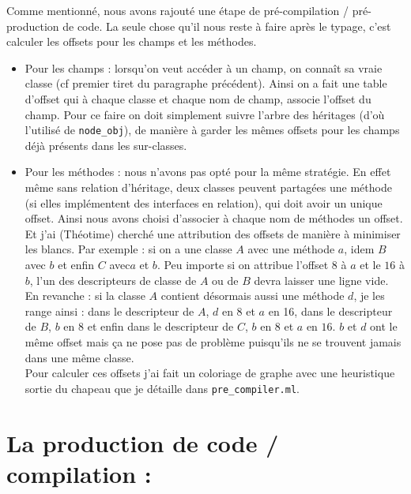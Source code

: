 \documentclass[12pt,a4paper]{report}
\begin{document}
\vspace{0.8cm}
\noindent Comme mentionné, nous avons rajouté une étape de pré-compilation / pré-production de code. La seule chose qu'il nous reste à faire après le typage, c'est calculer les offsets pour les champs et les méthodes.
\begin{itemize}[label=\textbullet]
\item Pour les champs : lorsqu'on veut accéder à un champ, on connaît sa vraie classe (cf premier tiret du paragraphe précédent). Ainsi on a fait une table d'offset qui à chaque classe et chaque nom de champ, associe l'offset du champ. Pour ce faire on doit simplement suivre l'arbre des héritages (d'où l'utilisé de \texttt{node\_obj}), de manière à garder les mêmes offsets pour les champs déjà présents dans les sur-classes. 
\item Pour les méthodes : nous n'avons pas opté pour la même stratégie. En effet même sans relation d'héritage, deux classes peuvent partagées une méthode (si elles implémentent des interfaces en relation), qui doit avoir un unique offset. Ainsi nous avons choisi d'associer à chaque nom de méthodes un offset. Et j'ai (Théotime) cherché une attribution des offsets de manière à minimiser les blancs. Par exemple : si on a une classe $A$ avec une méthode $a$, idem $B$ avec $b$ et enfin $C$ avec$a$ et $b$. Peu importe si on attribue l'offset $8$ à $a$ et le $16$ à $b$, l'un des descripteurs de classe de $A$ ou de $B$ devra laisser une ligne vide. En revanche : si la classe $A$ contient désormais aussi une méthode $d$, je les range ainsi : dans le descripteur de $A$, $d$ en $8$ et $a$ en 16, dans le descripteur de $B$, $b$ en $8$ et enfin dans le descripteur de $C$, $b$ en $8$ et $a$ en $16$. $b$ et $d$ ont le même offset mais ça ne pose pas de problème puisqu'ils ne se trouvent jamais dans une même classe. \\
Pour calculer ces offsets j'ai fait un coloriage de graphe avec une heuristique sortie du chapeau que je détaille dans \texttt{pre\_compiler.ml}.
\end{itemize}
\newpage
\section{La production de code / compilation :}
\end{document}
